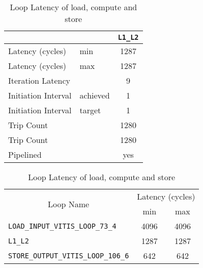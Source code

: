 \begin{table}
    \centering
    \begin{minipage}{0.48\linewidth}
        \centering
        \caption{Loop detail of the pipelined loop}\label{tab:fixed-loop}
        \begin{tabular}{ll|c}
            \toprule
                                &          & \verb+L1_L2+ \\
            \midrule
            Latency (cycles)    & min      & 1287                   \\
            Latency (cycles)    & max      & 1287                   \\
            Iteration Latency   &          & 9                      \\
            Initiation Interval & achieved & 1                      \\
            Initiation Interval & target   & 1                      \\
            Trip Count          &          & 1280                   \\
            Trip Count          &          & 1280                   \\
            Pipelined           &          & yes                    \\
            \bottomrule
        \end{tabular}
    \end{minipage}
    \begin{minipage}{0.48\linewidth}
        \centering
        \caption{Loop Latency of load, compute and store}
        \label{tab:fixed-loop-latency}
        \begin{tabular}{lcc}
            \toprule
            \multicolumn{1}{c}{\multirow{2}{*}{Loop Name}} & \multicolumn{2}{c}{Latency (cycles)}        \\
                                                           & min                                  & max  \\
            \midrule
            \verb+LOAD_INPUT_VITIS_LOOP_73_4+                         & 4096                                 & 4096 \\
            \verb+L1_L2+                         & 1287                                 & 1287 \\
            \verb+STORE_OUTPUT_VITIS_LOOP_106_6+                         & 642                                  & 642  \\
            \bottomrule
        \end{tabular}
    \end{minipage}
\end{table}



